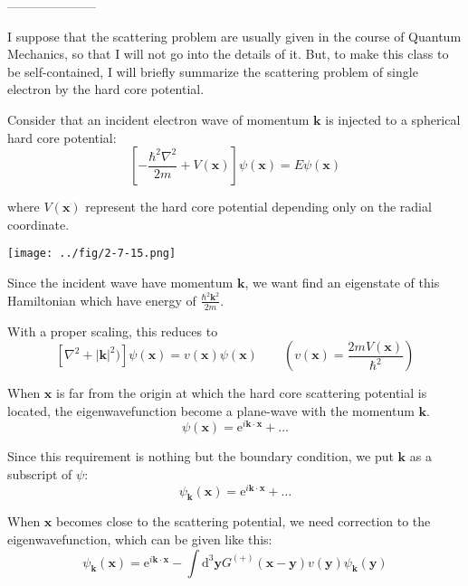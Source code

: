 \begin{center}---------------------\end{center}

I suppose that the scattering problem are usually given in the course of Quantum Mechanics, so that I will not go into the details of it. But, to make this class to be self-contained, I will briefly summarize the scattering problem of single electron by the hard core potential.

Consider that an incident electron wave of momentum $\mathbf{k}$ is injected to a spherical hard core potential:
\begin{equation*} \label{Eqs2.7.A.1} \tag{2.7.A.1}
\left[ -\frac{\hbar^2\nabla^2}{2m}+ V(\mathbf{x}) \right] \psi(\mathbf{x}) = E \psi(\mathbf{x})
\end{equation*}

where $V(\mathbf{x})$ represent the hard core potential depending only on the radial coordinate.
\begin{center} \texttt{[image: ../fig/2-7-15.png]} \label{Fig2.7.15} \end{center}

Since the incident wave have momentum $\mathbf{k}$, we want find an eigenstate of this Hamiltonian which have energy of $\frac{\hbar^2\mathbf{k}^2}{2m}$.

With a proper scaling, this reduces to
\begin{equation*} \label{Eqs2.7.A.1'} \tag{2.7.A.1'}
\left[ \nabla^2+ |\mathbf{k}|^2) \right] \psi(\mathbf{x}) = v(\mathbf{x}) \psi(\mathbf{x}) \qquad \left(v(\mathbf{x})=\frac{2mV(\mathbf{x})}{\hbar^2}\right)
\end{equation*}

When $\mathbf{x}$ is far from the origin at which the hard core scattering potential is located, the eigenwavefunction become a plane-wave with the momentum $\mathbf{k}$.
\[ \psi(\mathbf{x}) = \mathrm{e}^{i \mathbf{k}\cdot \mathbf{x}} + \ldots \]

Since this requirement is nothing but the boundary condition, we put $\mathbf{k}$ as a subscript of $\psi$:
\[ \psi_\mathbf{k}(\mathbf{x}) = \mathrm{e}^{i \mathbf{k}\cdot \mathbf{x}} + \ldots \]

When $\mathbf{x}$ becomes close to the scattering potential, we need correction to the eigenwavefunction, which can be given like this:
\begin{equation*} \label{Eqs2.7.A.2} \tag{2.7.A.2} \psi_\mathbf{k}(\mathbf{x}) = \mathrm{e}^{i \mathbf{k}\cdot \mathbf{x}} - \int \mathrm{d}^3 \mathbf{y} G^{(+)}(\mathbf{x}-\mathbf{y}) v(\mathbf{y}) \psi_{\mathbf{k}}(\mathbf{y})
\end{equation*}

